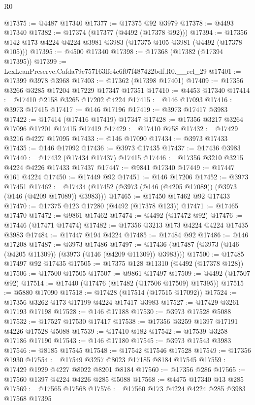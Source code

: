 \begin{lexlean}{R0}
\begin{coremodule}
@17375 := @4487 @17340
@17377 := @17375 @92 @3979
@17378 := @4493 @17340
@17382 := @17374 (@17377 (@4492 (@17378 @92)))
@17394 := @17356 @142 @173 @4224 @4224 @3981 @3983 (@17375 @105 @3981 (@4492 (@17378 @105)))
@17395 := @4500 @17340
@17398 := @17368 (@17382 (@17394 @17395))
@17399 := LexLeanPreserve.Cafda79c757163ffe4c6f07f487422bdf.R0.__rel_29
@17401 := @17399 @3978 @3968
@17403 := @17362 (@17398 @17401)
@17409 := @17356 @3266 @3285 @17204 @17229 @17347 @17351
@17410 := @4453 @17340
@17414 := @17410 @2158 @3265 @17202 @4224
@17415 := @146 @17093
@17416 := @3973 @17415
@17417 := @146 @17196
@17419 := @3973 @17417 @3983
@17422 := @17414 (@17416 @17419) @17347
@17428 := @17356 @3217 @3264 @17096 @17201 @17415 @17419
@17429 := @17410 @758
@17432 := @17429 @3216 @4227 @17095
@17433 := @146 @17090
@17434 := @3973 @17433
@17435 := @146 @17092
@17436 := @3973 @17435
@17437 := @17436 @3983
@17440 := @17432 (@17434 @17437) @17415
@17446 := @17356 @3210 @3215 @4224 @4226 @17433 @17437
@17447 := @9841 @17340
@17449 := @17447 @161 @4224
@17450 := @17449 @92
@17451 := @146 @17206
@17452 := @3973 @17451
@17462 := @17434 (@17452 (@3973 (@146 (@4205 @17089)) (@3973 (@146 (@4209 @17089)) @3983)))
@17465 := @17450 @17462 @92 @17433
@17470 := @17375 @123 @17280 (@4492 (@17378 @123))
@17471 := @17465 @17470
@17472 := @9861 @17462
@17474 := @4492 (@17472 @92)
@17476 := @17446 (@17471 @17474)
@17482 := @17356 @3213 @173 @4224 @4224 @17435 @3983
@17484 := @17447 @194 @4224
@17485 := @17484 @92
@17486 := @146 @17208
@17487 := @3973 @17486
@17497 := @17436 (@17487 (@3973 (@146 (@4205 @11309)) (@3973 (@146 (@4209 @11309)) @3983)))
@17500 := @17485 @17497 @92 @17435
@17505 := @17375 @128 @11310 (@4492 (@17378 @128))
@17506 := @17500 @17505
@17507 := @9861 @17497
@17509 := @4492 (@17507 @92)
@17514 := @17440 (@17476 (@17482 (@17506 @17509) @17395))
@17515 := @5880 @17090
@17518 := @17428 (@17514 (@17515 @17092))
@17524 := @17356 @3262 @173 @17199 @4224 @17417 @3983
@17527 := @17429 @3261 @17193 @17198
@17528 := @146 @17188
@17530 := @3973 @17528 @5088
@17532 := @17527 @17530 @17417
@17538 := @17356 @3259 @1397 @17191 @4226 @17528 @5088
@17539 := @17410 @182
@17542 := @17539 @3258 @17186 @17190
@17543 := @146 @17180
@17545 := @3973 @17543 @3983
@17546 := @8185 @17545
@17548 := @17542 @17546 @17528
@17549 := @17356 @1930
@17554 := @17549 @3257 @8023 @17185 @8184 @17545
@17559 := @17429 @1929 @4227 @8022 @8201 @8184
@17560 := @17356 @286
@17565 := @17560 @1397 @4224 @4226 @285 @5088
@17568 := @4475 @17340 @13 @285
@17569 := @17565 @17568
@17576 := @17560 @173 @4224 @4224 @285 @3983 @17568 @17395

\end{coremodule}
\end{lexlean}
